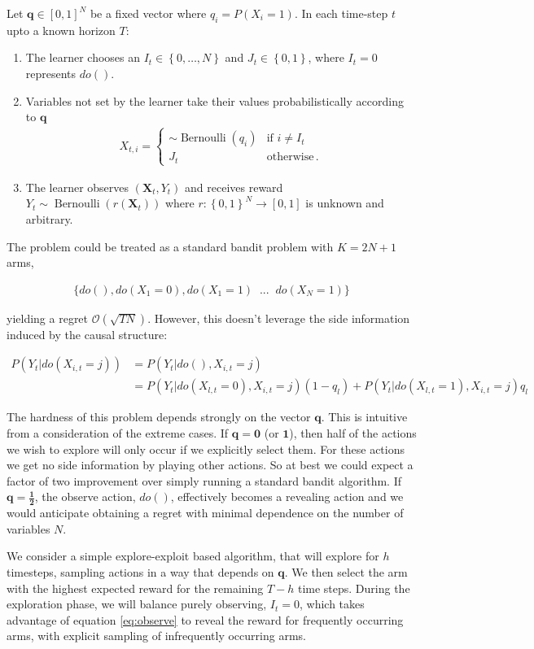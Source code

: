 \documentclass[11pt,a4paper]{article}
\newcommand{\set}[1]{\left\{#1\right\}}
\newcommand{\eqn}[1]{\begin{align}#1\end{align}}
\newcommand{\eq}[1]{\begin{align*}#1\end{align*}}
\newcommand{\Ber}{\operatorname{Bernoulli}}
\newcommand{\bigo}[1]{\mathcal{O}\left( #1 \right)}
\begin{document}
Let $\boldsymbol{q} \in [0,1]^N$ be a fixed vector where $q_i = P(X_i = 1)$. In each time-step $t$ upto a known horizon $T$:
 
\begin{enumerate}
\item The learner chooses an $I_t \in \set{0,\ldots, N}$ and $J_t \in \set{0,1}$, where $I_t = 0$ represents $do()$.

\item Variables not set by the learner take their values probabilistically according to $\boldsymbol{q}$ 
\eq{
X_{t,i} = \begin{cases}
\sim \Ber(q_i) &\text{if } i \neq I_t \\
J_t & \text{otherwise}\,.
\end{cases}
}
\item The learner observes $(\boldsymbol{X}_{t},Y_{t})$ and receives reward $Y_t \sim \Ber(r(\boldsymbol{X}_{t}))$ where $r:\set{0,1}^N \to [0,1]$ is unknown and arbitrary. 
\end{enumerate}

The problem could be treated as a standard bandit problem with $K = 2N + 1$ arms, 

\eq {
\{do(), do(X_1=0), do(X_1 = 1)\;\; ... \;\;do(X_N = 1)\}
}

yielding a regret $\bigo{\sqrt{TN}}$. However, this doesn't leverage the side information induced by the causal structure: 

\eqn {
\label{eq:observe}
P(Y_t|do(X_{i,t} = j)) &= P(Y_t|do(),X_{i,t} = j) \\
\label{eq:estimation_transfer}
&= P(Y_t|do(X_{l,t}=0),X_{i,t}=j)(1-q_l)+P(Y_t|do(X_{l,t}=1),X_{i,t}=j)q_l 
}

The hardness of this problem depends strongly on the vector $\boldsymbol{q}$. This is intuitive from a consideration of the extreme cases. If $\boldsymbol{q} = \boldsymbol{0}$ (or $\boldsymbol{1}$), then half of the actions we wish to explore will only occur if we explicitly select them. For these actions we get no side information by playing other actions. So at best we could expect a factor of two improvement over simply running a standard bandit algorithm. If $\boldsymbol{q} = \boldsymbol{\frac{1}{2}}$, the observe action, $do()$, effectively becomes a revealing action and we would anticipate obtaining a regret with minimal dependence on the number of variables $N$. 

We consider a simple explore-exploit based algorithm, that will explore for $h$ timesteps, sampling actions in a way that depends on $\boldsymbol{q}$. We then select the arm with the highest expected reward for the remaining $T-h$ time steps. During the exploration phase, we will balance purely observing, $I_t = 0$, which takes advantage of equation \ref{eq:observe} to reveal the reward for frequently occurring arms, with explicit sampling of infrequently occurring arms. 
\end{document}
